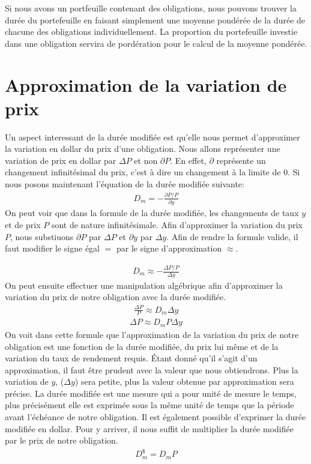\documentclass[12pt]{article}
\begin{document}
Si nous avons un portfeuille contenant des obligations, nous pouvons trouver la durée du portefeuille en faisant simplement une moyenne pondérée de la durée de chacune des obligations individuellement. La proportion du portefeuille investie dans une obligation servira de pordération pour le calcul de la moyenne pondérée.

\section{Approximation de la variation de prix}
Un aspect interessant de la durée modifiée est qu'elle nous permet d'approximer la variation en dollar du prix d'une obligation.  Nous allons représenter une variation de prix en dollar par $\Delta P$ et non $\partial P$. En effet, $\partial$ représente un changement infinitésimal du prix, c'est à dire un changement à la limite de 0. Si nous posons maintenant l'équation de la durée modifiée suivante:
\begin{align*}
D_m =-\frac{\partial P / P}{\partial y}
\end{align*}
On peut voir que dans la formule de la durée modifiée,  les changements de taux $y$ et de prix $P$ sont de nature infinitésimale.  Afin d'approximer la variation du prix $P$, nous substiuons $\partial P$ par $\Delta P$ et $\partial y$ par $\Delta y$.  Afin de rendre la formule valide,  il faut modifier le signe égal $=$ par le signe d'approximation $\approx$.

\begin{align*}
D_m \approx -\frac{\Delta P / P}{\Delta y}
\end{align*}
On peut ensuite effectuer une manipulation algébrique afin d'approximer la variation du prix de notre obligation avec la durée modifiée.
\begin{align*}
\frac{\Delta P}{P} \approx D_m \Delta y
\end{align*}
\begin{align*}
\Delta P \approx D_m P \Delta y
\end{align*}
On voit dans cette formule que l'approximation de la variation du prix de notre obligation est une fonction de la durée modifiée, du prix lui même et de la variation du taux de rendement requis. Étant donné qu'il s'agit d'un approximation, il faut être prudent avec la valeur que nous obtiendrons. Plus la variation de $y$, ($\Delta y$) sera petite, plus la valeur obtenue par approximation sera précise. La durée modifiée est une mesure qui a pour unité de mesure le temps, plus précisément elle est exprimée sous la même unité de temps que la période avant l'échéance de notre obligation. Il est également possible d'exprimer la durée modifiée en dollar. Pour y arriver, il nous suffit de multiplier la durée modifiée par le prix de notre obligation. 
\begin{align*}
D_m^{\$}=D_m P
\end{align*}
\end{document}
